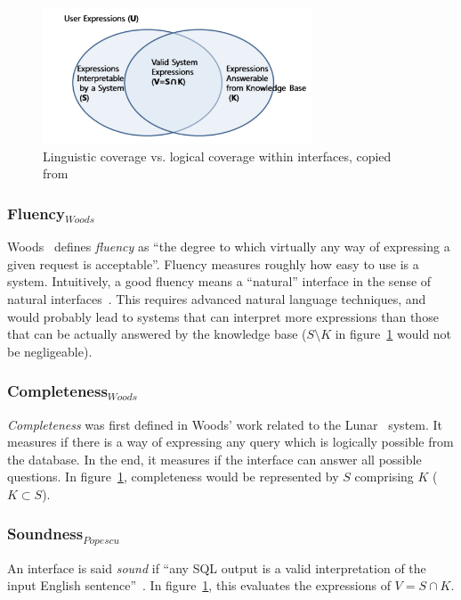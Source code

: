 \documentclass[10pt,journal,letterpaper,compsoc]{IEEEtran}
\begin{document}
 \begin{figure}[!h]
\centering
\includegraphics[width=8cm]{images/interface}
\caption{Linguistic coverage vs. logical coverage within interfaces, copied
from~\cite{Han:2010:NLI:1719970.1720022}}
\label{fig:interface}
\end{figure}

\subsubsection{Fluency$_{Woods}$}
Woods~\cite{Woods:1973:PNL:1499586.1499695} defines {\it fluency} as ``the degree
to which virtually any way of expressing a given request is acceptable''.
Fluency measures roughly how easy to use is a system. 
Intuitively, a good fluency means a ``natural'' interface in the sense of
natural interfaces~\cite{Hearst:2011:NSU:2018396.2018414}. This requires
advanced natural language techniques, and would probably lead to systems that
can interpret more expressions than those that can be actually answered by the
knowledge base ($S\setminus K$ in figure~\ref{fig:interface} would not be
negligeable).
 

\subsubsection{Completeness$_{Woods}$}
{\it Completeness} was first defined in Woods' work related to the {\sc
Lunar}~\cite{Woods:1973:PNL:1499586.1499695} system. 
It measures if there is a way of expressing any query which is logically
possible from the database. In the end, it measures if the interface can answer
all possible questions. In figure~\ref{fig:interface}, completeness would be
represented by $S$ comprising $K$ ($K\subset S$).


\subsubsection{Soundness$_{Popescu}$}
An interface is said {\it sound} if ``any SQL output is a valid interpretation
of the input English sentence''~\cite{Yates:2003:RNL:604045.604075}. In
figure~\ref{fig:interface}, this evaluates the expressions of $V=S\cap K$.
\end{document}
